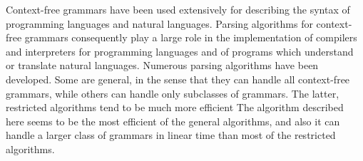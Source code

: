 %
\begin{isabellebody}%
%
%
\isadelimtheory
%
\endisadelimtheory
%
\isatagtheory
%
\endisatagtheory
{\isafoldtheory}%
%
\isadelimtheory
%
\endisadelimtheory
%
\isadelimdocument
%
\endisadelimdocument
%
\isatagdocument
%
\isamarkuptrue%
%
\isamarkuptrue%
%
\endisatagdocument
{\isafolddocument}%
%
\isadelimdocument
%
\endisadelimdocument
%
\begin{isamarkuptext}%
Context-free grammars have been used extensively for describing the syntax of programming languages
and natural languages. Parsing algorithms for context-free grammars consequently play a large role in
the implementation of compilers and interpreters for programming languages and of programs which understand
or translate natural languages. Numerous parsing algorithms have been developed. Some are general,
in the sense that they can handle all context-free grammars, while others can handle only subclasses of
grammars. The latter, restricted algorithms tend to be much more efficient The algorithm described here
seems to be the most efficient of the general algorithms, and also it can handle a larger class of grammars
in linear time than most of the restricted algorithms.


\end{isamarkuptext}
\end{isabellebody}
